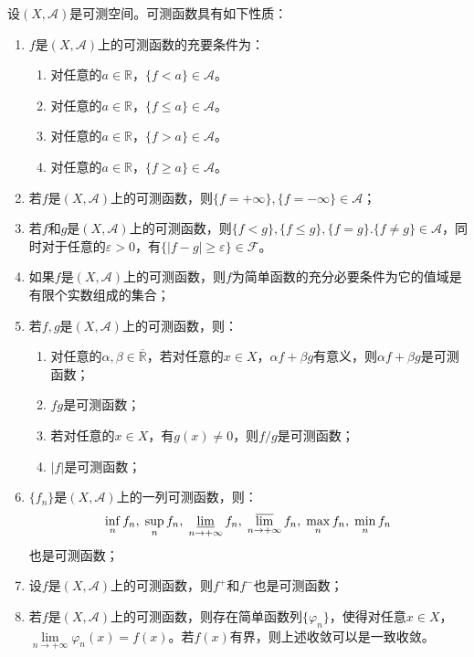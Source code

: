 \begin{property}\label{prop:MeasurableFunction}
	设$(X,\mathscr{A})$是可测空间。可测函数具有如下性质：
	\begin{enumerate}
		\item $f$是$(X,\mathscr{A})$上的可测函数的充要条件为：
		\begin{enumerate}
			\item 对任意的$a\in\mathbb{R}$，$\{f<a\}\in\mathscr{A}$。
			\item 对任意的$a\in\mathbb{R}$，$\{f\leqslant a\}\in\mathscr{A}$。
			\item 对任意的$a\in\mathbb{R}$，$\{f>a\}\in\mathscr{A}$。
			\item 对任意的$a\in\mathbb{R}$，$\{f\geqslant a\}\in\mathscr{A}$。
		\end{enumerate}
		\item 若$f$是$(X,\mathscr{A})$上的可测函数，则$\{f=+\infty\},\{f=-\infty\}\in\mathscr{A}$；
		\item 若$f$和$g$是$(X,\mathscr{A})$上的可测函数，则$\{f<g\},\{f\leqslant g\},\{f=g\}.\{f\ne g\}\in\mathscr{A}$，同时对于任意的$\varepsilon>0$，有$\{|f-g|\geqslant\varepsilon\}\in \mathscr{F}$。
		\item 如果$f$是$(X,\mathscr{A})$上的可测函数，则$f$为简单函数的充分必要条件为它的值域是有限个实数组成的集合；
		\item 若$f,g$是$(X,\mathscr{A})$上的可测函数，则：
		\begin{enumerate}
			\item 对任意的$\alpha,\beta\in\overline{\mathbb{R}}$，若对任意的$x\in X$，$\alpha f+\beta g$有意义，则$\alpha f+\beta g$是可测函数；
			\item $fg$是可测函数；
			\item 若对任意的$x\in X$，有$g(x)\ne0$，则$f/g$是可测函数；
			\item $|f|$是可测函数；
		\end{enumerate}
		\item $\{f_n\}$是$(X,\mathscr{A})$上的一列可测函数，则：
		\begin{equation*}
			\inf_nf_n,\;\sup_nf_n,\;
			\varliminf_{n\to+\infty}f_n,\;\varlimsup_{n\to+\infty}f_n,\;\max_nf_n,\;\min_nf_n
		\end{equation*}
		也是可测函数；
		\item 设$f$是$(X,\mathscr{A})$上的可测函数，则$f^+$和$f^-$也是可测函数；
		\item 若$f$是$(X,\mathscr{A})$上的可测函数，则存在简单函数列$\{\varphi_n\}$，使得对任意$x\in X$，$\lim\limits_{n\to+\infty}\varphi_n(x)=f(x)$。若$f(x)$有界，则上述收敛可以是一致收敛。
	\end{enumerate}
\end{property}
